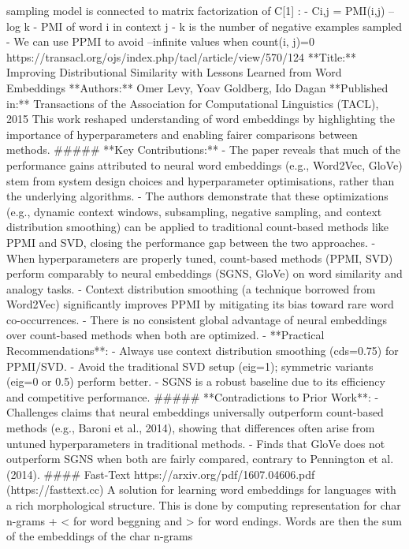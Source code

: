 \documentclass[
]{article}
\begin{document}
sampling model is connected to matrix factorization of C{[}1{]} : - Ci,j
= PMI(i,j) -- log k - PMI of word i in context j - k is the number of
negative examples sampled - We can use PPMI to avoid --infinite values
when count(i, j)=0
https://transacl.org/ojs/index.php/tacl/article/view/570/124 **Title:**
Improving Distributional Similarity with Lessons Learned from Word
Embeddings **Authors:** Omer Levy, Yoav Goldberg, Ido Dagan **Published
in:** Transactions of the Association for Computational Linguistics
(TACL), 2015 This work reshaped understanding of word embeddings by
highlighting the importance of hyperparameters and enabling fairer
comparisons between methods. \#\#\#\#\# **Key Contributions:** - The
paper reveals that much of the performance gains attributed to neural
word embeddings (e.g., Word2Vec, GloVe) stem from system design choices
and hyperparameter optimisations, rather than the underlying algorithms.
- The authors demonstrate that these optimizations (e.g., dynamic
context windows, subsampling, negative sampling, and context
distribution smoothing) can be applied to traditional count-based
methods like PPMI and SVD, closing the performance gap between the two
approaches. - When hyperparameters are properly tuned, count-based
methods (PPMI, SVD) perform comparably to neural embeddings (SGNS,
GloVe) on word similarity and analogy tasks. - Context distribution
smoothing (a technique borrowed from Word2Vec) significantly improves
PPMI by mitigating its bias toward rare word co-occurrences. - There is
no consistent global advantage of neural embeddings over count-based
methods when both are optimized. - **Practical Recommendations**: -
Always use context distribution smoothing (cds=0.75) for PPMI/SVD. -
Avoid the traditional SVD setup (eig=1); symmetric variants (eig=0 or
0.5) perform better. - SGNS is a robust baseline due to its efficiency
and competitive performance. \#\#\#\#\# **Contradictions to Prior
Work**: - Challenges claims that neural embeddings universally
outperform count-based methods (e.g., Baroni et al., 2014), showing that
differences often arise from untuned hyperparameters in traditional
methods. - Finds that GloVe does not outperform SGNS when both are
fairly compared, contrary to Pennington et al. (2014). \#\#\#\#
Fast-Text https://arxiv.org/pdf/1607.04606.pdf (https://fasttext.cc) A
solution for learning word embeddings for languages with a rich
morphological structure. This is done by computing representation for
char n-grams + \textless{} for word beggning and \textgreater{} for word
endings. Words are then the sum of the embeddings of the char n-grams
\end{document}
